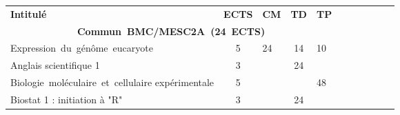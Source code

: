 


\renewcommand{\arraystretch}{1.5}%
\begin{tabular}{|m{5cm}|cm{0.75cm}|cm{0.75cm}|cm{0.75cm}|cm{0.75cm}|cm{0.75cm}|}
\cline{1-5}

\cellcolor{couleurFonce} \color{white}\bfseries Intitul\'e & \cellcolor{couleurFonce} \color{white}\bfseries ECTS & \cellcolor{couleurFonce} \color{white}\bfseries CM & \cellcolor{couleurFonce} \color{white}\bfseries TD & \cellcolor{couleurFonce} \color{white}\bfseries TP \\ \cline{1-5}
\cline{1-5} 
\multicolumn{5}{|c|}{\color{black} \mbox{\textbf{Commun BMC/MESC2A (24 ECTS)}}}  \\ \cline{1-5}

 \color{black} \mbox{Expression du génôme eucaryote} & \color{black} 5 & \color{black} 24 & \color{black} 14 & \color{black} 10 \\ \cline{1-5}

 \cellcolor{couleurClaire} \color{couleurTexte} Anglais scientifique 1  & \cellcolor{couleurClaire} \color{couleurTexte} 3 & \cellcolor{couleurClaire} \color{couleurTexte} & \cellcolor{couleurClaire} \color{couleurTexte} 24 & \cellcolor{couleurClaire} \color{couleurTexte} \\ \cline{1-5}

 \color{black} \mbox{Biologie moléculaire et cellulaire} \mbox{expérimentale} & \color{black} 5 & \color{black} & \color{black} & \color{black} 48 \\ \cline{1-5}

 \cellcolor{couleurClaire} \color{couleurTexte} Biostat 1 : initiation à "R"  & \cellcolor{couleurClaire} \color{couleurTexte} 3 & \cellcolor{couleurClaire} \color{couleurTexte} & \cellcolor{couleurClaire} \color{couleurTexte} 24 & \cellcolor{couleurClaire} \color{couleurTexte} 
\\ \cline{1-5}


\end{tabular}
